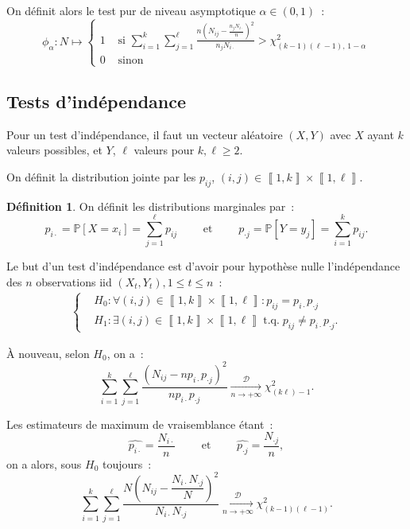 \documentclass{report}
\DeclareMathOperator{\tq}{\text{ t.q. }}
\renewcommand{\P}{\mathbb P}
\newcommand{\pinfty}{{+\infty}}
\newcommand{\cvgd}{\xrightarrow[n \to \pinfty]{\mathcal D}}
\newcommand{\intint}[2]{\left\llbracket#1, #2\right\rrbracket}
\theoremstyle{definition}
\newtheorem{déf}[thm]{Définition}
\theoremstyle{remark}
\begin{document}
			On définit alors le test pur de niveau asymptotique $\alpha \in (0, 1)$~:
			\[\phi_\alpha : N \mapsto
			\begin{cases}
				1 &\text{ si } \sum_{i=1}^k\sum_{j=1}^\ell \frac {n\left(N_{ij} - \frac {n_jN_{i\cdot}}n\right)^2}{n_jN_{i\cdot}}
					> \chi^2_{(k-1)(\ell-1),\,1-\alpha} \\
				0 &\text{ sinon}
			\end{cases}	\]

		\subsection{Tests d'indépendance}
			Pour un test d'indépendance, il faut un vecteur aléatoire $(X, Y)$ avec $X$ ayant $k$ valeurs possibles, et $Y$, $\ell$ valeurs pour $k, \ell \geq 2$.

			On définit la distribution jointe par les $p_{ij}$, $(i, j) \in \intint 1k \times \intint 1\ell$.

			\begin{déf} On définit les distributions marginales par~:
			\[p_{i\cdot} = \P[X = x_i] = \sum_{j=1}^\ell p_{ij} \qquad \text{ et } \qquad p_{\cdot j} = \P[Y = y_j] = \sum_{i=1}^kp_{ij}.\]
			\end{déf}

			Le but d'un test d'indépendance est d'avoir pour hypothèse nulle l'indépendance des $n$ observations iid $(X_t, Y_t), 1 \leq t \leq n$~:
			\begin{align}\label{eq:test_hyp_ind}
				\begin{cases}
					&H_0 : \forall (i, j) \in \intint 1k \times \intint 1\ell : p_{ij} = p_{i \cdot}p_{\cdot j} \\
					&H_1 : \exists (i, j) \in \intint 1k \times \intint 1\ell  \tq p_{ij} \neq p_{i \cdot}p_{\cdot j}.
				\end{cases}
			\end{align}

			À nouveau, selon $H_0$, on a~:
			\[\sum_{i=1}^k\sum_{j=1}^\ell \frac {(N_{ij} - np_{i\cdot}p_{\cdot j})^2}{np_{i\cdot}p_{\cdot j}} \cvgd \chi^2_{(k\ell)-1}.\]

			Les estimateurs de maximum de vraisemblance étant~:
			\[\hat {p_{i \cdot}} = \frac {N_{i \cdot}}n \qquad \text{ et } \qquad \hat {p_{\cdot j}} = \frac {N_{\cdot j}}n,\]
			on a alors, sous $H_0$ toujours~:
			\[\sum_{i=1}^k\sum_{j=1}^\ell \frac {N\left(N_{ij} - \dfrac {N_{i \cdot}N_{\cdot j}}N\right)^2}{N_{i \cdot}N_{\cdot j}} \cvgd \chi^2_{(k-1)(\ell-1)}.\]
\end{document}
